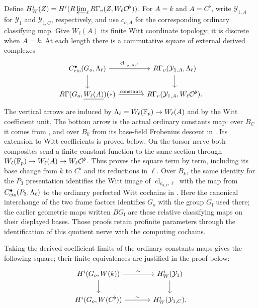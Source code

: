 Define $H_W^i(Z)=H^i(R\varprojlim_\ell
R\Gamma_v(Z,W_\ell\mathcal O^\flat))$.  For $A=k$ and $A=C^\flat$,
write $\mathcal Y_{1,A}$ for $\mathcal Y_1$ and $\mathcal Y_{1,C}$,
respectively, and use $c_{o,A}$ for the corresponding ordinary
classifying map.  Give $W_\ell(A)$ its finite Witt coordinate
topology; it is discrete when $A=k$.  At each length there is a
commutative square of external derived complexes
\begin{equation}\label{h3:eq:rat-finite-witt-square}
\begin{tikzcd}[column sep=large]
 C^\bullet_{\hthreects}(G_o,\Lambda_\ell)
   \arrow[r,"\operatorname{cl}_{c_{o,A},\ell}"] \arrow[d]
 & R\Gamma_v(\mathcal Y_{1,A},\Lambda_\ell) \arrow[d]\\
 R\Gamma(G_o,\underline{W_\ell(A)})(*) \arrow[r,"\mathrm{constants}"]
 & R\Gamma_v(\mathcal Y_{1,A},W_\ell\mathcal O^\flat).
\end{tikzcd}
\end{equation}
The vertical arrows are induced by
$\Lambda_\ell=W_\ell(\mathbb F_p)\to W_\ell(A)$ and by the Witt coefficient
unit.  The bottom arrow is the actual ordinary constants map: over
$B_C$ it comes from , and over $B_k$
from its base-field Frobenius descent in
.  Its extension to Witt
coefficients is proved below.
On the torsor nerve both composites send a finite constant function
to the same section through
$W_\ell(\mathbb F_p)\to W_\ell(A)\to W_\ell\mathcal O^\flat$.
Thus  proves the square term by term,
including its base change from $k$ to $C^\flat$ and its reductions in
$\ell$.  Over $B_k$, the same identity for the $P_3$ presentation
identifies the Witt image of $\operatorname{cl}_{c_{3,k},\ell}$ with
the map from $C^\bullet_{\mathrm{cts}}(P_3,\Lambda_\ell)$ to the
ordinary perfected Witt cochains in .
Here the canonical interchange of the two frame factors identifies
$G_o$ with the group $G_{\mathrm f}$ used there; the earlier geometric
maps written $BG_{\mathrm f}$ are these relative classifying maps on
their displayed bases.
Those proofs retain profinite parameters through the identification
of this quotient nerve with the computing cochains.

Taking the derived coefficient limits of the ordinary constants maps
gives the following square; their finite equivalences are justified
in the proof below:
\begin{equation}\label{h3:eq:rat-witt-square}
\begin{tikzcd}[column sep=large]
 H^i(G_o,W(k)) \arrow[r,"\sim"] \arrow[d]
     & H_W^i(\mathcal Y_1) \arrow[d]\\
 H^i(G_o,W(C^\flat)) \arrow[r,"\sim"]
     & H_W^i(\mathcal Y_{1,C}).
\end{tikzcd}
\end{equation}

